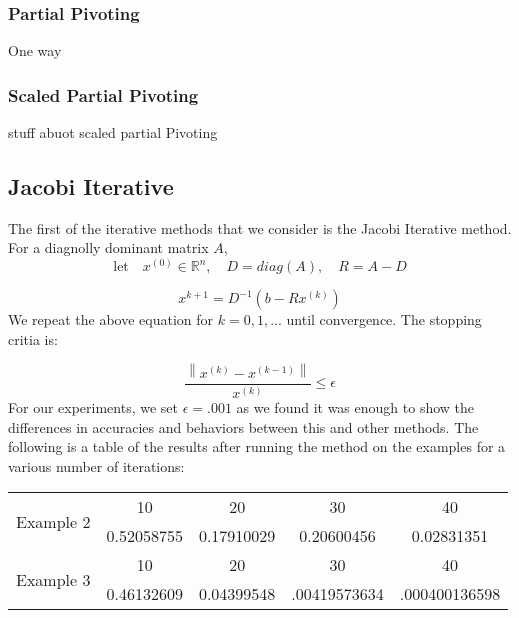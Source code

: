 \documentclass[11pt]{article}	%
\newcommand\norm[1]{\left\lVert#1\right\rVert}
\begin{document}
    \subsubsection{Partial Pivoting}
    One way 

    \subsubsection{Scaled Partial Pivoting}
    stuff abuot scaled partial Pivoting


\subsection{Jacobi Iterative}
    The first of the iterative methods that we consider is the Jacobi Iterative method. For a diagnolly dominant matrix $A$,
    \begin{equation}\label{eq:jacobi-eq-1-qualifier}
        \textrm{let} \quad x^{(0)}\in {\mathbb R}^n,\quad D = diag(A),\quad R = A - D
    \end{equation}

    \begin{equation}\label{eq:jacobi-eq-1}
        x^{k+1} = D^{-1}(b- Rx^{(k)})
    \end{equation}
    We repeat the above equation for $k = 0, 1, ...$ until convergence. The stopping critia is:

    \begin{equation}
        \frac{\norm{x^{(k)} - x^{(k-1)}}}{x^{(k)}} \leq \epsilon
    \end{equation}
    For our experiments, we set $\epsilon = .001$ as we found it was enough to show the differences in accuracies and behaviors between this and other methods. The following is a table of the results after running the method on the examples for a various number of iterations:
    \begin{center}
        \begin{tabular}{||c|c|c|c|c||}
            \hline
            \multirow{2}{5em}{Example 2} & 10 & 20 & 30 & 40 \\ [.25em]
            & 0.52058755 & 0.17910029 & 0.20600456 & 0.02831351 \\ [.25em]
            \hline \hline
            \multirow{2}{5em}{Example 3} & 10 & 20 & 30 & 40 \\ [.25em]
            & 0.46132609 & 0.04399548 & .00419573634 & .000400136598 \\ [.25em]
            \hline
        \end{tabular}
    \end{center}
\end{document}
